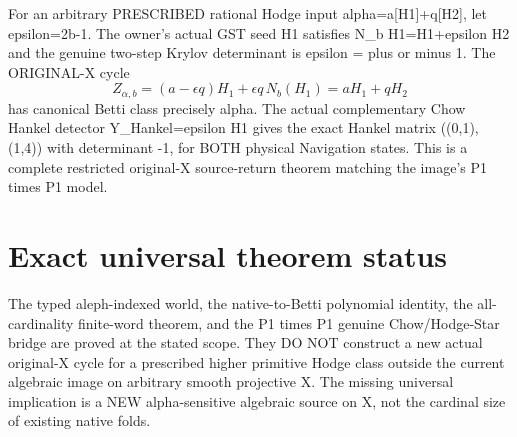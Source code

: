 \documentclass[11pt]{article}
\begin{document}
For an arbitrary PRESCRIBED rational Hodge input
alpha=a[H1]+q[H2], let epsilon=2b-1.
The owner's actual GST seed H1 satisfies
N_b H1=H1+epsilon H2 and the genuine two-step
Krylov determinant is epsilon = plus or minus 1.
The ORIGINAL-X cycle
\[
\boxed{
Z_{\alpha,b}
=(a-\epsilon q)H_1+\epsilon q\,N_b(H_1)
=aH_1+qH_2
}
\]
has canonical Betti class precisely alpha.
The actual complementary Chow Hankel detector
Y_Hankel=epsilon H1 gives
the exact Hankel matrix ((0,1),(1,4))
with determinant -1, for BOTH physical
Navigation states. This is a complete
restricted original-X source-return theorem
matching the image's P1 times P1 model.

\section{Exact universal theorem status}
The typed aleph-indexed world,
the native-to-Betti polynomial identity,
the all-cardinality finite-word theorem,
and the P1 times P1 genuine Chow/Hodge-Star bridge
are proved at the stated scope. They DO NOT
construct a new actual original-X cycle for
a prescribed higher primitive Hodge class
outside the current algebraic image on
arbitrary smooth projective X.
The missing universal implication is a
NEW alpha-sensitive algebraic source on X,
not the cardinal size of existing native folds.
\end{document}

